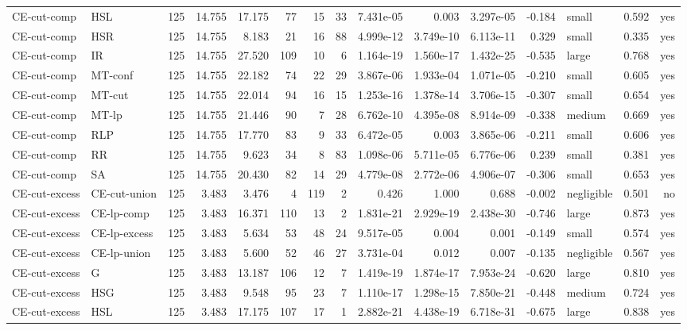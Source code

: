 \begin{table}[htbp]
\begin{tabular}{llrrrrrrrrrrlrr}
CE-cut-comp & HSL & 125 & 14.755 & 17.175 & 77 & 15 & 33 & 7.431e-05 & 0.003 & 3.297e-05 & -0.184 & small & 0.592 & yes \\
CE-cut-comp & HSR & 125 & 14.755 & 8.183 & 21 & 16 & 88 & 4.999e-12 & 3.749e-10 & 6.113e-11 & 0.329 & small & 0.335 & yes \\
CE-cut-comp & IR & 125 & 14.755 & 27.520 & 109 & 10 & 6 & 1.164e-19 & 1.560e-17 & 1.432e-25 & -0.535 & large & 0.768 & yes \\
CE-cut-comp & MT-conf & 125 & 14.755 & 22.182 & 74 & 22 & 29 & 3.867e-06 & 1.933e-04 & 1.071e-05 & -0.210 & small & 0.605 & yes \\
CE-cut-comp & MT-cut & 125 & 14.755 & 22.014 & 94 & 16 & 15 & 1.253e-16 & 1.378e-14 & 3.706e-15 & -0.307 & small & 0.654 & yes \\
CE-cut-comp & MT-lp & 125 & 14.755 & 21.446 & 90 & 7 & 28 & 6.762e-10 & 4.395e-08 & 8.914e-09 & -0.338 & medium & 0.669 & yes \\
CE-cut-comp & RLP & 125 & 14.755 & 17.770 & 83 & 9 & 33 & 6.472e-05 & 0.003 & 3.865e-06 & -0.211 & small & 0.606 & yes \\
CE-cut-comp & RR & 125 & 14.755 & 9.623 & 34 & 8 & 83 & 1.098e-06 & 5.711e-05 & 6.776e-06 & 0.239 & small & 0.381 & yes \\
CE-cut-comp & SA & 125 & 14.755 & 20.430 & 82 & 14 & 29 & 4.779e-08 & 2.772e-06 & 4.906e-07 & -0.306 & small & 0.653 & yes \\
CE-cut-excess & CE-cut-union & 125 & 3.483 & 3.476 & 4 & 119 & 2 & 0.426 & 1.000 & 0.688 & -0.002 & negligible & 0.501 & no \\
CE-cut-excess & CE-lp-comp & 125 & 3.483 & 16.371 & 110 & 13 & 2 & 1.831e-21 & 2.929e-19 & 2.438e-30 & -0.746 & large & 0.873 & yes \\
CE-cut-excess & CE-lp-excess & 125 & 3.483 & 5.634 & 53 & 48 & 24 & 9.517e-05 & 0.004 & 0.001 & -0.149 & small & 0.574 & yes \\
CE-cut-excess & CE-lp-union & 125 & 3.483 & 5.600 & 52 & 46 & 27 & 3.731e-04 & 0.012 & 0.007 & -0.135 & negligible & 0.567 & yes \\
CE-cut-excess & G & 125 & 3.483 & 13.187 & 106 & 12 & 7 & 1.419e-19 & 1.874e-17 & 7.953e-24 & -0.620 & large & 0.810 & yes \\
CE-cut-excess & HSG & 125 & 3.483 & 9.548 & 95 & 23 & 7 & 1.110e-17 & 1.298e-15 & 7.850e-21 & -0.448 & medium & 0.724 & yes \\
CE-cut-excess & HSL & 125 & 3.483 & 17.175 & 107 & 17 & 1 & 2.882e-21 & 4.438e-19 & 6.718e-31 & -0.675 & large & 0.838 & yes \\

\end{tabular}
\end{table}

